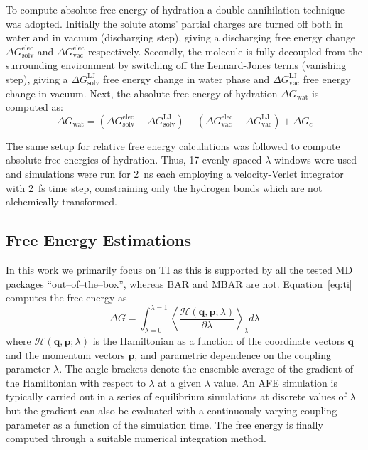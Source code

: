 \documentclass[journal=jctcce,manuscript=article]{achemso}
\renewcommand{\vec}[1]{\mathbf{#1}}
\begin{document}
To compute absolute free energy of hydration a double annihilation 
technique~\cite{jorgensen1988efficient,GILSON19971047,Bosisio2016}
was adopted. 
Initially the solute atoms' partial charges are turned off both in water and in 
vacuum (discharging step), giving a discharging
free energy change $\Delta G_\mathrm{solv}^\mathrm{elec}$ and $\Delta 
G_\mathrm{vac}^\mathrm{elec}$ respectively. Secondly,
the molecule is fully decoupled from the surrounding environment by switching 
off the Lennard-Jones terms (vanishing step), giving a $\Delta 
G_\mathrm{solv}^\mathrm{LJ}$ free energy change in water phase and $\Delta 
G_\mathrm{vac}^\mathrm{LJ}$ free energy change in vacuum. 
Next, the absolute free energy of hydration $\Delta G_\mathrm{wat}$ is computed as:
\begin{equation}
\label{eq:absolutehyd}
\Delta G_\mathrm{wat} = (\Delta G_\mathrm{solv}^\mathrm{elec} + \Delta 
G_\mathrm{solv}^\mathrm{LJ}) - (\Delta G_\mathrm{vac}^\mathrm{elec} + \Delta 
G_\mathrm{vac}^\mathrm{LJ}) + \Delta G_c
\end{equation}

The same setup for relative free energy calculations was followed to compute absolute free energies of hydration. Thus, 17 evenly spaced $\lambda$ windows were used and simulations were run for \SI{2}{ns} each employing a velocity-Verlet integrator with \SI{2}{fs} time step, constraining only the hydrogen bonds which are not alchemically transformed. 


\subsection{Free Energy Estimations}
\label{sec:analysis}

In this work we primarily focus on TI as this is supported by all the tested MD packages ``out--of--the--box'', whereas BAR and MBAR are not.
Equation~\ref{eq:ti} computes the free energy as
\begin{equation}\label{eq:ti}
	\Delta G = \int_{\lambda=0}^{\lambda=1}
	\left\langle 
	\frac{\mathscr{H}(\vec{q},\vec{p};\lambda)}{\partial\lambda}\right\rangle_\lambda
	 d\lambda
\end{equation}
where $\mathscr{H}(\vec{q},\vec{p};\lambda)$ is the Hamiltonian as a function 
of the coordinate vectors $\vec{q}$ and the momentum vectors $\vec{p}$, and 
parametric dependence on the coupling parameter $\lambda$.  The angle brackets 
denote the ensemble average of the gradient of the Hamiltonian with respect to 
$\lambda$ at a given $\lambda$ value.  An AFE simulation is typically carried 
out in a series of equilibrium simulations at discrete values of $\lambda$ but 
the gradient can also be evaluated with a continuously varying coupling 
parameter as a function of the simulation time.  The free energy is finally 
computed through a suitable numerical integration method.
\end{document}
